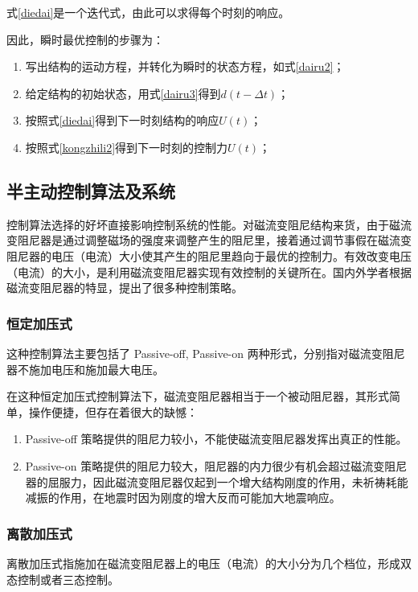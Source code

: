 式\eqref{diedai}是一个迭代式，由此可以求得每个时刻的响应。

因此，瞬时最优控制的步骤为：
\begin{enumerate}
\item 写出结构的运动方程，并转化为瞬时的状态方程，如式\eqref{dairu2}；
\item 给定结构的初始状态，用式\eqref{dairu3}得到$d(t-\Delta t)$；
\item 按照式\eqref{diedai}得到下一时刻结构的响应$U(t)$；
\item 按照式\eqref{kongzhili2}得到下一时刻的控制力$U(t)$；
\end{enumerate}


\subsection{半主动控制算法及系统}
控制算法选择的好坏直接影响控制系统的性能。对磁流变阻尼结构来货，由于磁流变阻尼器是通过调整磁场的强度来调整产生的阻尼里，接着通过调节事假在磁流变阻尼器的电压（电流）大小使其产生的阻尼里趋向于最优的控制力。有效改变电压（电流）的大小，是利用磁流变阻尼器实现有效控制的关键所在。国内外学者根据磁流变阻尼器的特显，提出了很多种控制策略。

\subsubsection{恒定加压式}
这种控制算法主要包括了 Passive-off, Passive-on 两种形式，分别指对磁流变阻尼器不施加电压和施加最大电压。

在这种恒定加压式控制算法下，磁流变阻尼器相当于一个被动阻尼器，其形式简单，操作便捷，但存在着很大的缺憾：
\begin{enumerate}
\item Passive-off 策略提供的阻尼力较小，不能使磁流变阻尼器发挥出真正的性能。
\item Passive-on 策略提供的阻尼力较大，阻尼器的内力很少有机会超过磁流变阻尼器的屈服力，因此磁流变阻尼器仅起到一个增大结构刚度的作用，未祈祷耗能减振的作用，在地震时因为刚度的增大反而可能加大地震响应。
\end{enumerate}

\subsubsection{离散加压式}
离散加压式指施加在磁流变阻尼器上的电压（电流）的大小分为几个档位，形成双态控制或者三态控制。


